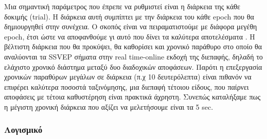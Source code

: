 \documentclass[11pt,a4paper,english,greek,twoside]{../Thesis}
\begin{document}
\par Μια σημαντική παράμετρος που έπρεπε να ρυθμιστεί είναι η διάρκεια της κάθε δοκιμής (trial). Η διάρκεια αυτή συμπίπτει με την διάρκεια του κάθε epoch που θα δημιουργηθεί στην συνέχεια. Ο σκοπός είναι να πειραματιστούμε με διάφορα μεγέθη epoch, έτσι ώστε να αποφανθούμε γι αυτό που δίνει τα καλύτερα αποτελέσματα . Η βέλτιστη διάρκεια που θα προκύψει, θα καθορίσει και χρονικό παράθυρο στο οποίο θα αναλύονται τα SSVEP σήματα στην real time-online εκδοχή της διεπαφής, δηλαδή το ελάχιστο χρονικό διάστημα μεταξύ δυο διαδοχικών αποφάσεων. Παρότι η επεξεργασία χρονικών παραθύρων μεγάλων σε διάρκεια (π.χ 10 δευτερόλεπτα) είναι πιθανόν να επιφέρει καλύτερα ποσοστά ταξινόμησης, μια διεπαφή τέτοιου είδους, που παίρνει αποφάσεις με τέτοια καθυστέρηση είναι πρακτικά άχρηστη. Συνεπώς καταλήξαμε πως η μέγιστη χρονική διάρκεια που αξίζει να μελετήσουμε είναι τα 5 sec. 

\subsubsection{Λογισμικό}
\end{document}
